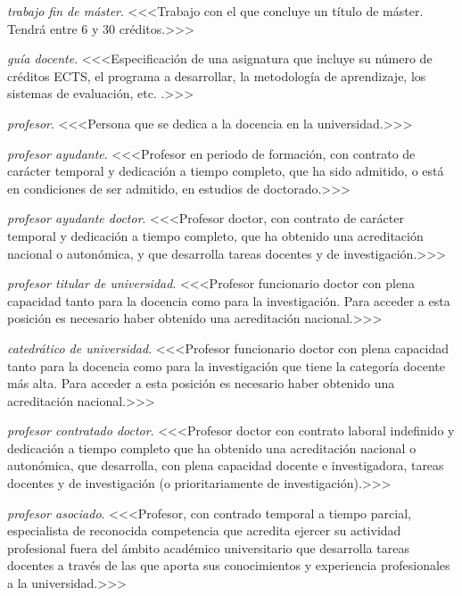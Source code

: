     \item \emph{trabajo fin de máster}. <<<Trabajo con el que concluye un título de máster\cite[artículo 15, apartado 3]{rd1393}. Tendrá entre 6 y 30 créditos.>>>

    \item \emph{guía docente}. <<<Especificación de una asignatura que incluye su número de créditos ECTS, el programa a desarrollar, la metodología de aprendizaje, los sistemas de evaluación, etc. \cite[sección D.5]{guiaMadridMasD}.>>>

    \item \emph{profesor}. <<<Persona que se dedica a la docencia en la universidad.>>>

    \item \emph{profesor ayudante}. <<<Profesor en periodo de formación, con contrato de carácter temporal y dedicación a tiempo completo, que ha sido admitido, o está en condiciones de ser admitido, en estudios de doctorado\cite[artículo 49]{leyUniversidades}.>>>

    \item \emph{profesor ayudante doctor}. <<<Profesor doctor, con contrato de carácter temporal y dedicación a tiempo completo, que ha obtenido una acreditación nacional o autonómica, y que desarrolla tareas docentes y de investigación\cite[artículo 50]{leyUniversidades}.>>>  

    \item \emph{profesor titular de universidad}. <<<Profesor funcionario doctor con plena capacidad tanto para la docencia como para la investigación. Para acceder a esta posición es necesario haber obtenido una acreditación nacional\cite{leyUniversidades}.>>>

    \item \emph{catedrático de universidad}. <<<Profesor funcionario doctor con plena capacidad tanto para la docencia como para la investigación que tiene la categoría docente más alta. Para acceder a esta posición es necesario haber obtenido una acreditación nacional\cite{leyUniversidades}.>>>

    \item \emph{profesor contratado doctor}. <<<Profesor doctor con contrato laboral indefinido y dedicación a tiempo completo que ha obtenido una acreditación nacional o autonómica, que desarrolla, con plena capacidad docente e investigadora, tareas docentes y de investigación (o prioritariamente de investigación)\cite[artículo 52]{leyUniversidades}.>>>

    \item \emph{profesor asociado}. <<<Profesor, con contrado temporal a tiempo parcial, especialista de reconocida competencia que acredita ejercer su actividad profesional fuera del ámbito académico universitario que desarrolla tareas docentes a través de las que aporta sus conocimientos y experiencia profesionales a la universidad\cite[artículo 53]{leyUniversidades}.>>>

